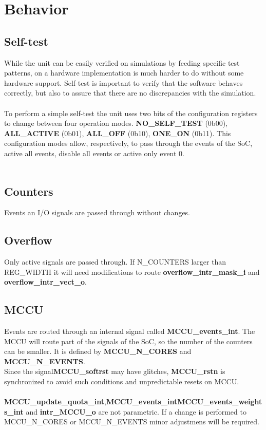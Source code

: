 \section{Behavior}\label{behavior}

\subsection{Self-test}
While the unit can be easily verified on simulations by feeding specific test patterns, on a hardware implementation is much harder to do without some hardware support. Self-test is important to verify that the software behaves correctly, but also to assure that there are no discrepancies with the simulation.\\
\\
To perform a simple self-test the unit uses two bits of the configuration registers to change between four operation modes. \textbf{NO\_SELF\_TEST} (0b00), \textbf{ALL\_ACTIVE} (0b01), \textbf{ALL\_OFF} (0b10), \textbf{ONE\_ON} (0b11). This configuration modes allow, respectively, to pass through the events of the SoC, active all events, disable all events or active  only event 0.\\
\\ 
\subsection{Counters}
Events an I/O signals are passed through without changes.

\subsection{Overflow}
Only active signals are passed through. If N\_COUNTERS larger than REG\_WIDTH it will need modifications to route \textbf{overflow\_intr\_mask\_i} and \textbf{overflow\_intr\_vect\_o}.

\subsection{MCCU}
Events are routed through an internal signal called \textbf{MCCU\_events\_int}. The MCCU will route part of the signals of the SoC, so the number of the counters can be smaller. It is defined by \textbf{MCCU\_N\_CORES} and \textbf{MCCU\_N\_EVENTS}.\\
Since the signal\textbf{MCCU\_softrst} may have glitches, \textbf{MCCU\_rstn} is synchronized to avoid such conditions and unpredictable resets on MCCU.\\
\\
\textbf{MCCU\_update\_quota\_int},\textbf{MCCU\_events\_int}\textbf{MCCU\_events\_weights\_int} and \textbf{intr\_MCCU\_o} are not parametric. If a change is performed to MCCU\_N\_CORES or MCCU\_N\_EVENTS minor adjustmens will be required.

